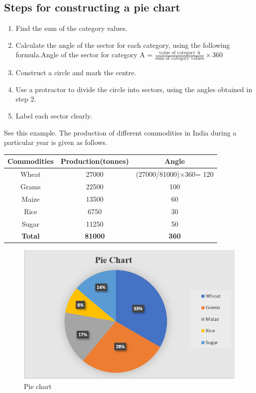 \documentclass[
]{book}
\providecommand{\tightlist}{%
  \setlength{\itemsep}{0pt}\setlength{\parskip}{0pt}}
\begin{document}
\subsection{Steps for constructing a pie chart}\label{steps-for-constructing-a-pie-chart}

\begin{enumerate}
\def\labelenumi{\arabic{enumi}.}
\tightlist
\item
  Find the sum of the category values.\\
\item
  Calculate the angle of the sector for each category, using the
  following formula.Angle of the sector for category A =
  \(\frac{\text{value of category A}}{\text{sum of category values}} \times 360\)\\
\item
  Construct a circle and mark the centre.\\
\item
  Use a protractor to divide the circle into sectors, using the angles
  obtained in step 2.\\
\item
  Label each sector clearly.
\end{enumerate}

See this example.
The production of different commodities in India during a particular
year is given as follows.

\begin{longtable}[]{@{}ccc@{}}
\toprule\noalign{}
Commodities & Production(tonnes) & Angle \\
\midrule\noalign{}
\endhead
\bottomrule\noalign{}
\endlastfoot
Wheat & 27000 & (27000/81000)×360= 120 \\
Grams & 22500 & 100 \\
Maize & 13500 & 60 \\
Rice & 6750 & 30 \\
Sugar & 11250 & 50 \\
\textbf{Total} & \textbf{81000} & \textbf{360} \\
\end{longtable}

\begin{figure}

{\centering \includegraphics[width=0.8\linewidth]{images/piechart} 

}

\caption{Pie chart}\label{fig:piechart}
\end{figure}
\end{document}
